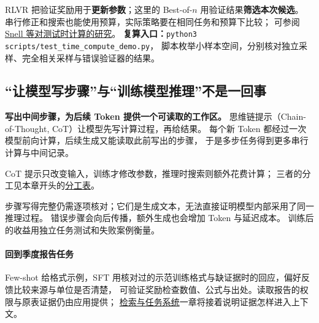 RLVR 把验证奖励用于\textbf{更新参数}；这里的 Best-of-$n$ 用验证结果\textbf{筛选本次候选}。
串行修正和搜索也能使用预算，实际策略要在相同任务和预算下比较；
可参阅 \href{https://arxiv.org/abs/2408.03314}{Snell 等对测试时计算的研究}。
\textbf{复算入口：}\texttt{python3 scripts/test\_time\_compute\_demo.py}，
脚本枚举小样本空间，分别核对独立采样、完全相关采样与错误验证器的结果。


\subsection{“让模型写步骤”与“训练模型推理”不是一回事}
\label{concept:cot-prompt}

\textbf{写出中间步骤，为后续 Token 提供一个可读取的工作区。}
思维链提示（Chain-of-Thought, CoT）让模型先写计算过程，再给结果。
每个新 Token 都经过一次模型前向计算，后续生成又能读取此前写出的步骤，
于是多步任务得到更多串行计算与中间记录。

CoT 提示只改变输入，训练才修改参数，推理时搜索则额外花费计算；
三者的分工见本章开头的\hyperref[sec:training-inference-roles]{分工表}。

\begin{boundarybox}
步骤写得完整仍需逐项核对；它们是生成文本，无法直接证明模型内部采用了同一推理过程。
错误步骤会向后传播，额外生成也会增加 Token 与延迟成本。
训练后的收益用独立任务测试和失败案例衡量。
\end{boundarybox}

\paragraph{回到季度报告任务}
Few-shot 给格式示例，SFT 用核对过的示范训练格式与缺证据时的回应，偏好反馈比较来源与单位是否清楚，
可验证奖励检查数值、公式与出处。读取报告的权限与原表证据仍由应用提供；
\hyperref[intro:23d-agent-systems]{检索与任务系统}一章将接着说明证据怎样进入上下文。


